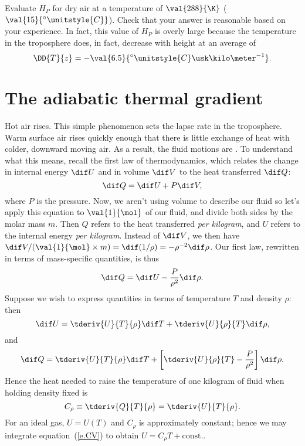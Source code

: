 \begin{exercisebox}
Evaluate $H_{P}$ for dry air at a temperature of $\val{288}{\K}$ ($\val{15}{^{\circ}\unitstyle{C}}$).  Check that your answer is reasonable based on your experience.  In fact, this value of $H_{P}$ is overly large because the temperature in the troposphere does, in fact, decrease with height at an average  of
\[
	\DD{T}{z} = -\val{6.5}{^{\circ}\unitstyle{C}\usk\kilo\meter^{-1}}.
\]
\end{exercisebox}

\section{The adiabatic thermal gradient}\label{s.adiabatic-gradient}
Hot air rises. This simple phenomenon sets the lapse rate in the troposphere. Warm surface air rises quickly enough that there is little exchange of heat with colder, downward moving air.  As a result, the fluid motions are .  To understand what this means, recall the first law of thermodynamics\cite{Fermi1956Thermodynamics}, which relates the change in internal energy $\dif U$ and in volume $\dif V$ to the heat transferred $\dif Q$:
\begin{equation}\label{e.first-law-thermo}
	\dif Q = \dif U + P\dif V,
\end{equation}
where $P$ is the pressure.  Now, we aren't using volume to describe our fluid so let's apply this equation to $\val{1}{\mol}$ of our fluid, and divide both sides by the molar mass $m$.  Then $Q$ refers to the heat transferred \emph{per kilogram}, and $U$ refers to the internal energy \emph{per kilogram}.  Instead of $\dif V$, we then have $\dif V/(\val{1}{\mol}\times m) = \dif(1/\rho) = -\rho^{-2}\dif\rho$.  Our first law, rewritten in terms of mass-specific quantities, is thus
\begin{equation}\label{e.first-law-thermo-astro}
	\dif Q = \dif U -\frac{P}{\rho^{2}}\dif \rho.
\end{equation}
Suppose we wish to express quantities in terms of temperature $T$ and density $\rho$: then
\[ \dif U = \tderiv{U}{T}{\rho}\dif T + \tderiv{U}{\rho}{T}\dif \rho, \]
and
\[ \dif Q = \tderiv{U}{T}{\rho}\dif T + \left[\tderiv{U}{\rho}{T} - \frac{P}{\rho^{2}}\right]\dif \rho. \]
Hence the heat needed to raise the temperature of one kilogram of fluid when holding density fixed is
\begin{equation}\label{e.CV}
C_{\rho} \equiv \tderiv{Q}{T}{\rho} = \tderiv{U}{T}{\rho}.
\end{equation}
For an ideal gas, $U = U(T)$ and $C_{\rho}$ is approximately constant; hence we may integrate equation~(\ref{e.CV}) to obtain $U = C_{\rho}T + \textrm{const.}$.

